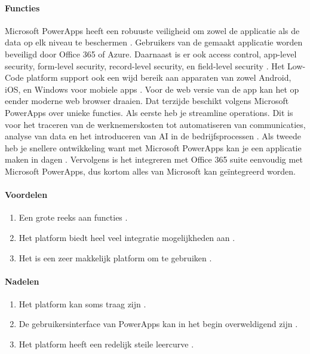 \paragraph{Functies}
Microsoft PowerApps heeft een robuuste veiligheid om zowel de applicatie als de data op elk niveau te beschermen \autocite{Nguyen}.
Gebruikers van de gemaakt applicatie worden beveiligd door Office 365 of Azure. Daarnaast is er ook access control, app-level security, form-level security, record-level security, en field-level security  \autocite{Nguyen}.
Het Low-Code platform support ook een wijd bereik aan apparaten van zowel Android, iOS, en Windows voor mobiele apps \autocite{Nguyen}.
Voor de web versie van de app kan het op eender moderne web browser draaien. Dat terzijde beschikt volgens \textcite{Gupta2023} Microsoft PowerApps over unieke functies. Als eerste heb je 
streamline operations. Dit is voor het traceren van de werknemerskosten tot automatiseren van communicaties, analyse van data en het introduceren van AI in de bedrijfsprocessen \autocite{Gupta2023}.
Als tweede heb je snellere ontwikkeling want met Microsoft PowerApps kan je een applicatie maken in dagen \autocite{Gupta2023}. Vervolgens is het integreren met Office 365 suite eenvoudig met Microsoft PowerApps,
 dus kortom alles van Microsoft kan geïntegreerd worden.

 \paragraph*{Voordelen}
\begin{enumerate}
    \item Een grote reeks aan functies \autocite{Marvin2018}.
    \item Het platform biedt heel veel integratie mogelijkheden aan \autocite{Marvin2018}.
    \item Het is een zeer makkelijk platform om te gebruiken \autocite{Marvin2018}.
\end{enumerate}


\paragraph*{Nadelen}
\begin{enumerate}
    \item Het platform kan soms traag zijn \autocite{Marvin2018}.
    \item De gebruikersinterface van PowerApps kan in het begin overweldigend zijn \autocite{Marvin2018}.
    \item Het platform heeft een redelijk steile leercurve \autocite{Marvin2018}.
\end{enumerate}

